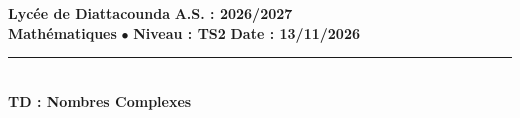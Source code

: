 \documentclass[12pt,a4paper]{article}
\begin{document}
\renewcommand{\arraystretch}{1.5}
\renewcommand{\arrayrulewidth}{1.2pt}
\begin{tcolorbox}[
    colback=white,
    colframe=blue!60!black,
    boxrule=0.8pt,
    arc=3pt,
    left=3mm, right=3mm, top=2.5mm, bottom=2.5mm
]
    \begin{center}
        \textbf{\large Lycée de Diattacounda} \hfill \textbf{A.S. : 2026/2027} \\[1mm]
        \textbf{Mathématiques} $\bullet$ \textbf{Niveau : TS2} \hfill \textbf{Date : 13/11/2026} \\[2mm]
        \rule{0.8\linewidth}{0.4pt} \\[1.5mm]
        {\Large\bfseries\sffamily TD : Nombres Complexes}
    \end{center}
\end{tcolorbox}
\vspace{4mm}
\end{document}
